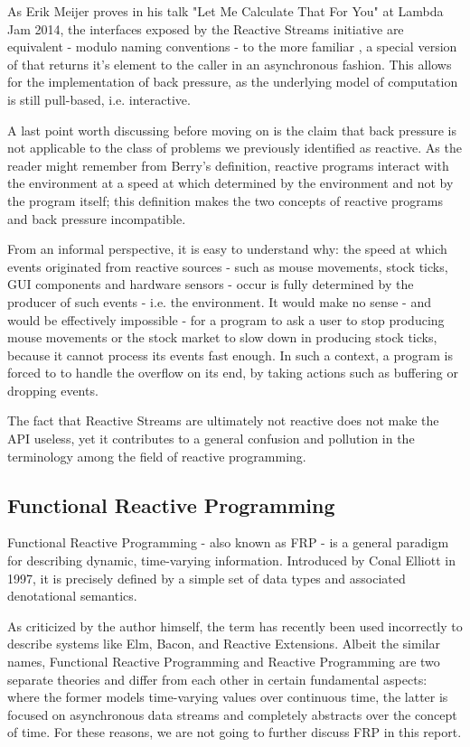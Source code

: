 As Erik Meijer proves in his talk "Let Me Calculate That For You" at Lambda Jam 2014\cite{meijer2014reactive}, the interfaces exposed by the Reactive Streams initiative are equivalent - modulo naming conventions - to the more familiar , a special version of  that returns it's element to the caller in an asynchronous fashion. This allows for the implementation of back pressure, as the underlying model of computation is still pull-based, i.e. interactive.

A last point worth discussing before moving on is the claim that back pressure is not applicable to the class of problems we previously identified as reactive. As the reader might remember from Berry's definition, reactive programs interact with the environment at a speed at which determined by the environment and not by the program itself\cite{berry1991reactive}; this definition makes the two concepts of reactive programs and back pressure incompatible. 

From an informal perspective, it is easy to understand why: the speed at which events originated from reactive sources - such as mouse movements, stock ticks, GUI components and hardware sensors - occur is fully determined by the producer of such events - i.e. the environment. It would make no sense - and would be effectively impossible - for a program to ask a user to stop producing mouse movements or the stock market to slow down in producing stock ticks, because it cannot process its events fast enough. In such a context, a program is forced to to handle the overflow on its end, by taking actions such as buffering or dropping events.

The fact that Reactive Streams are ultimately not reactive does not make the API useless, yet it contributes to a general confusion and pollution in the terminology among the field of reactive programming.

\subsection{Functional Reactive Programming}
\label{frp}

Functional Reactive Programming - also known as FRP - is a general paradigm for describing dynamic, time-varying information. Introduced by Conal Elliott in 1997\cite{elliott1997functional}, it is precisely defined by a simple set of data types and associated denotational semantics. 

As criticized by the author himself, the term has recently been used incorrectly to describe systems like Elm, Bacon, and Reactive Extensions\cite{elliott2015frp}. Albeit the similar names, Functional Reactive Programming  and Reactive Programming are two separate theories and differ from each other in certain fundamental aspects: where the former models time-varying values over continuous time, the latter is focused on asynchronous data streams and completely abstracts over the concept of time. For these reasons, we are not going to further discuss FRP in this report.

